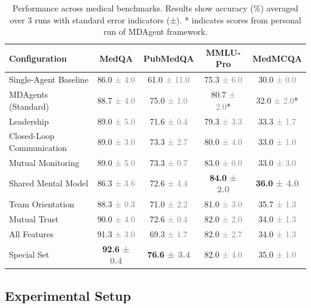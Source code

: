 \documentclass[letterpaper]{article} %
\begin{document}
\begin{table}[t]
\centering
\caption{Performance across medical benchmarks. Results show accuracy (\%) averaged over 3 runs with standard error indicators (±). * indicates scores from personal run of MDAgent framework.}
\label{tab:comprehensive_results}
\small
\begin{tabular}{l|cccc}
\hline
\textbf{Configuration} & \textbf{MedQA} & \textbf{PubMedQA} & \textbf{MMLU-Pro} & \textbf{MedMCQA} \\
\hline
Single-Agent Baseline & 86.0 \textcolor{gray}{± 4.0} & 61.0 \textcolor{gray}{± 11.0} & 75.3 \textcolor{gray}{± 6.0} & 30.0 \textcolor{gray}{± 0.0} \\
MDAgents (Standard) & 88.7 \textcolor{gray}{± 4.0} & 75.0 \textcolor{gray}{± 1.0} & 80.7 \textcolor{gray}{± 2.0}* & 32.0 \textcolor{gray}{± 2.0}* \\
Leadership & 89.0 \textcolor{gray}{± 5.0} & 71.6 \textcolor{gray}{± 0.4} & 79.3 \textcolor{gray}{± 3.3} & 33.3 \textcolor{gray}{± 1.7} \\
Closed-Loop Communication & 89.0 \textcolor{gray}{± 3.0} & 73.3 \textcolor{gray}{± 2.7} & 80.0 \textcolor{gray}{± 4.0} & 33.0 \textcolor{gray}{± 1.0} \\
Mutual Monitoring & 89.0 \textcolor{gray}{± 5.0} & 73.3 \textcolor{gray}{± 0.7} & 83.0 \textcolor{gray}{± 0.0} & 33.0 \textcolor{gray}{± 3.0} \\
Shared Mental Model & 86.3 \textcolor{gray}{± 3.6} & 72.6 \textcolor{gray}{± 4.4} & \textbf{84.0} \textcolor{gray}{\textbf{± 2.0}} & \textbf{36.0} \textcolor{gray}{\textbf{± 4.0}} \\
Team Orientation & 88.3 \textcolor{gray}{± 0.3} & 71.0 \textcolor{gray}{± 2.2} & 81.0 \textcolor{gray}{± 3.0} & 35.7 \textcolor{gray}{± 1.3} \\
Mutual Trust & 90.0 \textcolor{gray}{± 4.0} & 72.6 \textcolor{gray}{± 0.4} & 82.0 \textcolor{gray}{± 2.0} & 34.0 \textcolor{gray}{± 1.3} \\
All Features & 91.3 \textcolor{gray}{± 3.0} & 69.3 \textcolor{gray}{± 1.7} & 82.0 \textcolor{gray}{± 2.7} & 34.0 \textcolor{gray}{± 1.3} \\
Special Set & \textbf{92.6} \textcolor{gray}{\textbf{± 0.4}} & \textbf{76.6} \textcolor{gray}{\textbf{± 3.4}} & 82.0 \textcolor{gray}{± 4.0} & 35.0 \textcolor{gray}{± 1.0} \\
\hline
\end{tabular}
\end{table}

\subsection{Experimental Setup}
\end{document}
